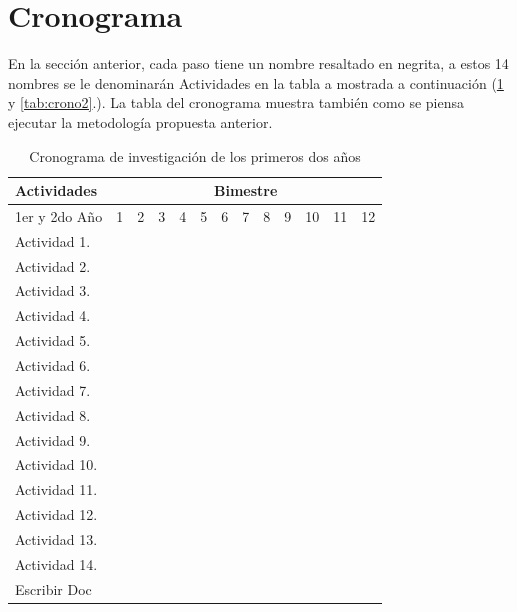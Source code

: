 \section[Cronograma]{Cronograma}
\label{sec:cronograma}
En la secci\'on anterior, cada paso tiene un nombre resaltado en negrita, a estos 14 nombres se le denominar\'an Actividades en la tabla a mostrada a continuaci\'on (\tablename  \ref{tab:crono} y \ref{tab:crono2}.). La tabla del cronograma muestra también como se piensa ejecutar la metodolog\'ia propuesta anterior.\par
\begin{table}[!htb]
  \centering
  \newcommand{\Bk}{\multicolumn{1}{G}{ }}
  \begin{tabular}{|p{3.0cm}||c|c|c|c|c|c|c|c|c|c|c|c|}\hline
    Actividades&\multicolumn{12}{|c|}{Bimestre}\\\hline\hline
    1er y  2do A\~no&1&2 &3  &4  &5  &6  &7  &8  &9  &10 &11 &12 \\\hline
    Actividad 1. &\Bk&   &   &   &   &\Bk&   &   &   &\Bk&   &   \\\hline
    Actividad 2. &\Bk&\Bk&   &   &\Bk&\Bk&   &\Bk&\Bk&\Bk&\Bk&\Bk\\\hline
    Actividad 3. &   &\Bk&   &   &\Bk&\Bk&   &\Bk&\Bk&\Bk&\Bk&\Bk\\\hline
    Actividad 4. &   &\Bk&   &   &   &\Bk&\Bk&\Bk&\Bk&\Bk&\Bk&\Bk\\\hline
    Actividad 5. &\Bk&   &   &\Bk&   &\Bk&   &   &   &\Bk&   &   \\\hline
    Actividad 6. &\Bk&   &   &\Bk&   &\Bk&   &   &   &\Bk&   &   \\\hline
    Actividad 7. &   &   &\Bk&\Bk&\Bk&   &\Bk&\Bk&\Bk&   &\Bk&\Bk\\\hline
    Actividad 8. &   &\Bk&   &\Bk&   &\Bk&   &   &   &\Bk&   &   \\\hline
    Actividad 9. &   &   &   &\Bk&   &   &\Bk&\Bk&\Bk&   &\Bk&\Bk\\\hline
    Actividad 10.&   &   &\Bk&\Bk&\Bk&   &\Bk&\Bk&\Bk&   &\Bk&\Bk\\\hline
    Actividad 11.&   &   &\Bk&\Bk&\Bk&   &\Bk&\Bk&\Bk&   &\Bk&\Bk\\\hline
    Actividad 12.&   &   &   &   &\Bk&   &   &\Bk&\Bk&   &\Bk&\Bk\\\hline
    Actividad 13.&   &   &   &   &   &   &   &   &   &   &   &   \\\hline
    Actividad 14.&   &   &   &   &   &   &   &   &   &   &   &   \\\hline
    Escribir Doc &   &\Bk&   &\Bk&   &\Bk&   &\Bk&   &\Bk&   &\Bk\\\hline    
  \end{tabular}
  \caption{Cronograma de investigaci\'on de los primeros dos a\~nos}
  \label{tab:crono}
\end{table}
